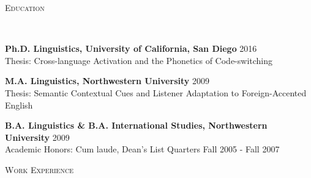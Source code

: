 \documentclass[9pt]{article}
\newenvironment{changemargin}[2]{%
  \begin{list}{}{%
    \setlength{\topsep}{0pt}%
    \setlength{\leftmargin}{#1}%
    \setlength{\rightmargin}{#2}%
    \setlength{\listparindent}{\parindent}%
    \setlength{\itemindent}{\parindent}%
    \setlength{\parsep}{\parskip}%
  }%
  \item[]}{\end{list}
}
\newcommand{\lineover}{
	\begin{changemargin}{-0.05in}{-0.05in}
		\vspace*{-8pt}
		\hrulefill \\
		\vspace*{-2pt}
	\end{changemargin}
}
\newcommand{\header}[1]{
	\begin{changemargin}{-0.5in}{-0.5in}
		\scshape{#1}\\
  	\lineover
	\end{changemargin}
}
\newenvironment{body} {
	\vspace*{-16pt}
	\begin{changemargin}{-0.25in}{-0.5in}
  }	
	{\end{changemargin}
}
\begin{document}
\smallskip


\header{\color{red}Education}

\begin{body}
	\vspace{14pt}
	
	\textbf{Ph.D. Linguistics, University of California, San Diego} \hfill 2016{} \\
	Thesis: Cross-language Activation and the Phonetics of Code-switching\\
 	 \medskip
	 \medskip

	\textbf{M.A. Linguistics, Northwestern University} \hfill 2009 \\
	Thesis: Semantic Contextual Cues and Listener Adaptation to Foreign-Accented English\\
 	 \medskip
	 \medskip

	\textbf{B.A. Linguistics \& B.A. International Studies, Northwestern University} \hfill 2009 \\
	Academic Honors: Cum laude, Dean's List Quarters Fall 2005 - Fall 2007\\
	\medskip

\end{body}

\smallskip


\header{\color{red}Work Experience}
\end{document}
